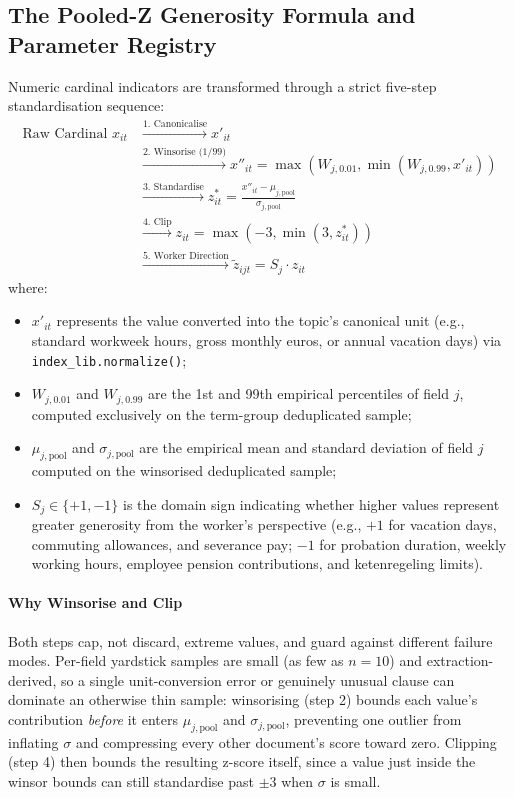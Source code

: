 \subsection{The Pooled-Z Generosity Formula and Parameter Registry}
\label{sec:pooled_z_params}

Numeric cardinal indicators are transformed through a strict five-step standardisation sequence:
\begin{align}
\label{eq:pooled-z-full}
\text{Raw Cardinal } x_{it} 
&\xrightarrow{\text{1. Canonicalise}} x'_{it} \nonumber \\
&\xrightarrow{\text{2. Winsorise (1/99)}} x''_{it} = \max(W_{j,0.01}, \min(W_{j,0.99}, x'_{it})) \nonumber \\
&\xrightarrow{\text{3. Standardise}} z^*_{it} = \frac{x''_{it} - \mu_{j,\text{pool}}}{\sigma_{j,\text{pool}}} \nonumber \\
&\xrightarrow{\text{4. Clip}} z_{it} = \max(-3, \min(3, z^*_{it})) \nonumber \\
&\xrightarrow{\text{5. Worker Direction}} \tilde{z}_{ijt} = S_j \cdot z_{it}
\end{align}
where:
\begin{itemize}[leftmargin=1.5em]
  \item $x'_{it}$ represents the value converted into the topic's canonical unit (e.g., standard workweek hours, gross monthly euros, or annual vacation days) via \nolinkurl{index_lib.normalize()};
  \item $W_{j,0.01}$ and $W_{j,0.99}$ are the 1st and 99th empirical percentiles of field $j$, computed exclusively on the term-group deduplicated sample;
  \item $\mu_{j,\text{pool}}$ and $\sigma_{j,\text{pool}}$ are the empirical mean and standard deviation of field $j$ computed on the winsorised deduplicated sample;
  \item $S_j \in \{+1, -1\}$ is the domain sign indicating whether higher values represent greater generosity from the worker's perspective (e.g., $+1$ for vacation days, commuting allowances, and severance pay; $-1$ for probation duration, weekly working hours, employee pension contributions, and ketenregeling limits).
\end{itemize}

\paragraph{Why Winsorise and Clip}
Both steps cap, not discard, extreme values, and guard against different failure modes. Per-field yardstick samples are small (as few as $n=10$) and extraction-derived, so a single unit-conversion error or genuinely unusual clause can dominate an otherwise thin sample: winsorising (step 2) bounds each value's contribution \emph{before} it enters $\mu_{j,\text{pool}}$ and $\sigma_{j,\text{pool}}$, preventing one outlier from inflating $\sigma$ and compressing every other document's score toward zero. Clipping (step 4) then bounds the resulting z-score itself, since a value just inside the winsor bounds can still standardise past $\pm3$ when $\sigma$ is small.

